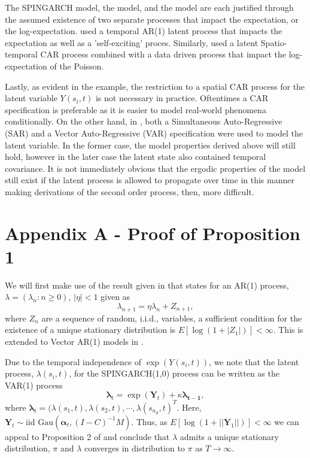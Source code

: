 \documentclass[11pt]{isuthesis}
\begin{document}
The SPINGARCH model, the \cite{martinez2008autoregressive} model, and \cite{mohler2013modeling} the model are each justified through the assumed existence of two separate processes that impact the expectation, or the log-expectation.  \cite{mohler2013modeling} used a temporal AR(1) latent process that impacts the expectation as well as a 'self-exciting' proces.  Similarly, \cite{martinez2008autoregressive} used a latent Spatio-temporal CAR process combined with a data driven process that impact the log-expectation of the Poisson. 

Lastly, as evident in the example, the restriction to a spatial CAR process for the latent variable $Y(s_i,t)$ is not necessary in practice.  Oftentimes a CAR specification is preferable as it is easier to model real-world phenomena conditionally.  On the other hand, in \cite{2017arXiv170308429C}, both a Simultaneous Auto-Regressive (SAR) and a Vector Auto-Regressive (VAR) specification were used to model the latent variable.  In the former case, the model properties derived above will still hold, however in the later case the latent state also contained temporal covariance.  It is not immediately obvious that the ergodic properties of the model still exist if the latent process is allowed to propagate over time in this manner making derivations of the second order process, then, more difficult.

\section*{Appendix A - Proof of Proposition 1}

We will first make use of the result given in \cite{athreya1986mixing} that states for an AR(1) process, $\lambda=(\lambda_n:n\geq 0)$, $|\eta|<1$ given as
\begin{equation}
	\lambda_{n+1}=\eta \lambda_{n}+Z_{n+1},
\end{equation}
where $Z_{n}$ are a sequence of random, i.i.d., variables, a sufficient condition for the existence of a unique stationary distribution is $E[\log(1+|Z_1|)]<\infty$.  This is extended to Vector AR(1) models in \cite{zeevi2004recurrence}.

Due to the temporal independence of $\exp(Y(s_i,t))$, we note that the latent process, $\lambda(s_i,t)$, for the SPINGARCH(1,0) process can be written as the VAR(1) process
\begin{equation}
	\boldsymbol{\lambda}_t=\exp(\boldsymbol{Y}_t)+\kappa\boldsymbol{\lambda_{t-1}},
\end{equation}
where $\boldsymbol{\lambda}_{t} = (\lambda(s_1,t),\lambda(s_2,t),\cdots,\lambda(s_{n_d},t)^T$.  Here, $\boldsymbol{Y}_t \sim \mbox{iid Gau}\left(\boldsymbol{\alpha}_t,(I-C)^{-1}M\right)$.  Thus, as $E[\log \left(1+||\boldsymbol{Y}_1||\right)]<\infty$ we can appeal to Proposition 2 of \cite{zeevi2004recurrence} and conclude that $\lambda$ admits a unique stationary distribution, $\pi$ and $\lambda$ converges in distribution to $\pi$ as $T\to \infty$.
\end{document}
